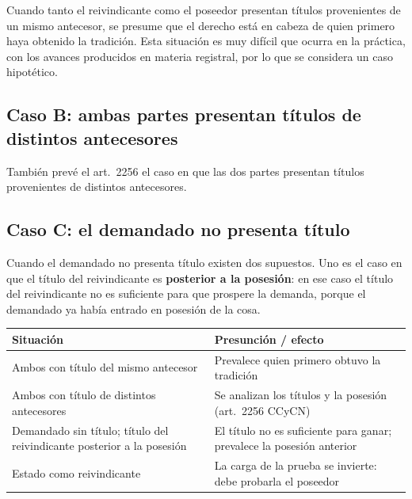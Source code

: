 \documentclass[12pt,oneside]{book}
\begin{document}
Cuando tanto el reivindicante como el poseedor presentan títulos provenientes de un mismo antecesor, se presume que el derecho está en cabeza de quien primero haya obtenido la tradición. Esta situación es muy difícil que ocurra en la práctica, con los avances producidos en materia registral, por lo que se considera un caso hipotético.

\subsection{Caso B: ambas partes presentan títulos de distintos antecesores}

También prevé el art.\ 2256 el caso en que las dos partes presentan títulos provenientes de distintos antecesores.


\subsection{Caso C: el demandado no presenta título}

Cuando el demandado no presenta título existen dos supuestos. Uno es el caso en que el título del reivindicante es \textbf{posterior a la posesión}: en ese caso el título del reivindicante no es suficiente para que prospere la demanda, porque el demandado ya había entrado en posesión de la cosa.


\begin{table}[H]
\centering
\small
\begin{tabularx}{\textwidth}{
    >{\raggedright\arraybackslash}X
    >{\raggedright\arraybackslash}X
}
\toprule
\textbf{Situación} & \textbf{Presunción / efecto} \\
\midrule
Ambos con título del mismo antecesor & Prevalece quien primero obtuvo la tradición \\
Ambos con título de distintos antecesores & Se analizan los títulos y la posesión (art.\ 2256 CCyCN) \\
Demandado sin título; título del reivindicante posterior a la posesión & El título no es suficiente para ganar; prevalece la posesión anterior \\
Estado como reivindicante & La carga de la prueba se invierte: debe probarla el poseedor \\
\bottomrule
\end{tabularx}
\end{table}
\end{document}
